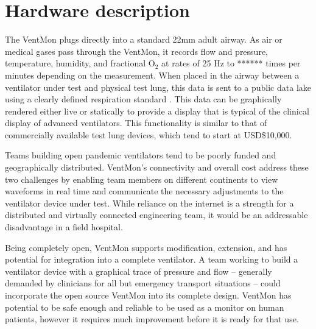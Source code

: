 \documentclass[11pt, letterpaper]{article}
\begin{document}
\section{Hardware description}


The VentMon plugs directly into a standard 22mm adult airway. As air or medical gases pass through the VentMon, it records flow and pressure, temperature, humidity, and fractional O$_2$ at rates of 25 Hz to ****** times per minutes depending on the measurement. When placed in the airway between a ventilator under test and physical test lung, this data is sent to a public data lake \cite{VentDisplay} using a clearly defined respiration standard \cite{PIRDS}. This data can be graphically rendered either live or statically to provide a display that is typical of the clinical display of advanced ventilators. This functionality is similar to that of commercially available test lung devices, which tend to start at USD\$10,000.

Teams building open pandemic ventilators tend to be poorly funded and geographically distributed. VentMon's connectivity and overall cost address these two challenges by enabling team members on different continents to view waveforms in real time and communicate the necessary adjustments to the ventilator device under test. While reliance on the internet is a strength for a distributed and virtually connected engineering team, it would be an addressable disadvantage in a field hospital. 

Being completely open, VentMon supports modification, extension, and has potential for integration into a complete ventilator. A team working to build a ventilator device with a graphical trace of pressure and flow -- generally demanded by clinicians for all but emergency transport situations -- could incorporate the open source VentMon into its complete design. VentMon has potential to be safe enough and reliable to be used as a monitor on human patients, however it requires much improvement before it is ready for that use.
\\
\end{document}
